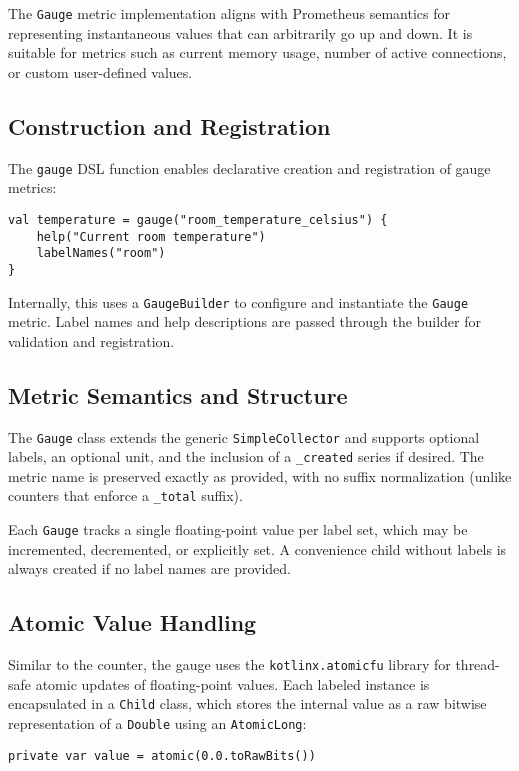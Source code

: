 The \texttt{Gauge} metric implementation aligns with Prometheus semantics for representing instantaneous values that can arbitrarily go up and down. It is suitable for metrics such as current memory usage, number of active connections, or custom user-defined values.

\subsection{Construction and Registration}
The \texttt{gauge} DSL function enables declarative creation and registration of gauge metrics:
\begin{verbatim}
val temperature = gauge("room_temperature_celsius") {
    help("Current room temperature")
    labelNames("room")
}
\end{verbatim}
Internally, this uses a \texttt{GaugeBuilder} to configure and instantiate the \texttt{Gauge} metric. Label names and help descriptions are passed through the builder for validation and registration.





\subsection{Metric Semantics and Structure}
The \texttt{Gauge} class extends the generic 
\texttt{SimpleCollector} and supports optional labels, 
an optional unit, and the inclusion of a \texttt{\_created} series if desired. 
The metric name is preserved exactly as provided, with no suffix normalization (unlike counters that enforce a \texttt{\_total} suffix).

Each \texttt{Gauge} tracks a single floating-point value per label set, which may be incremented, decremented, or explicitly set. A convenience child without labels is always created if no label names are provided.



\subsection{Atomic Value Handling}
Similar to the counter, the gauge uses the \texttt{kotlinx.atomicfu} library for thread-safe atomic updates of floating-point values. Each labeled instance is encapsulated in a \texttt{Child} class, which stores the internal value as a raw bitwise representation of a \texttt{Double} using an \texttt{AtomicLong}:

\begin{verbatim}
private var value = atomic(0.0.toRawBits())
\end{verbatim}

